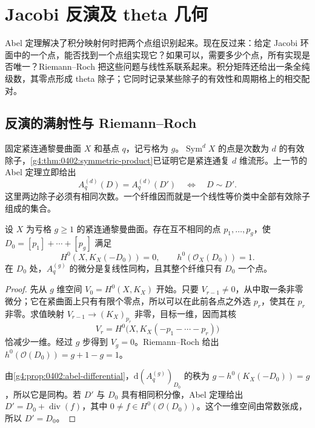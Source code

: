 
% 
% 

\section{Jacobi 反演及 theta 几何}
\label{g4:sec:0404}

Abel 定理解决了积分映射何时把两个点组识别起来。现在反过来：给定 Jacobi 环面中的一个点，能否找到一个点组实现它？如果可以，需要多少个点，所有实现是否唯一？Riemann--Roch 把这些问题与线性系联系起来。积分矩阵还给出一条全纯级数，其零点形成 theta 除子；它同时记录某些除子的有效性和周期格上的相交配对。

\subsection{反演的满射性与 Riemann–Roch}
\label{g4:subsec:0404:01}

固定紧连通黎曼曲面 \(X\) 和基点 \(q\)，记亏格为 \(g\)。\(\operatorname{Sym}^dX\) 的点是次数为 \(d\) 的有效除子，\cref{g4:thm:0402:symmetric-product}已证明它是紧连通复 \(d\) 维流形。上一节的 Abel 定理立即给出
\begin{equation}
	\label{g4:eq:0404:same-fiber}
	A_q^{(d)}(D)=A_q^{(d)}(D')
	\quad\Longleftrightarrow\quad D\sim D'.
\end{equation}
这里两边除子必须有相同次数。一个纤维因而就是一个线性等价类中全部有效除子组成的集合。

\begin{lemma}
	\label{g4:lem:0404:nonspecial-divisor}
	设 \(X\) 为亏格 \(g\ge1\) 的紧连通黎曼曲面。存在互不相同的点 \(p_1,\ldots,p_g\)，使 \(D_0=[p_1]+\cdots+[p_g]\) 满足
	\[
		H^0(X,K_X(-D_0))=0,\qquad h^0(\mathcal O_X(D_0))=1.
	\]
	在 \(D_0\) 处，\(A_q^{(g)}\) 的微分是复线性同构，且其整个纤维只有 \(D_0\) 一个点。
\end{lemma}
\begin{proof}
	先从 \(g\) 维空间 \(V_0=H^0(X,K_X)\) 开始。只要 \(V_{r-1}\ne0\)，从中取一条非零微分；它在紧曲面上只有有限个零点，所以可以在此前各点之外选 \(p_r\)，使其在 \(p_r\) 非零。求值映射 \(V_{r-1}\to(K_X)_{p_r}\) 非零，目标一维，因而其核
	\[
		V_r=H^0\bigl(X,K_X(-p_1-\cdots-p_r)\bigr)
	\]
	恰减少一维。经过 \(g\) 步得到 \(V_g=0\)。Riemann--Roch 给出 \(h^0(\mathcal O(D_0))=g+1-g=1\)。

	由\cref{g4:prop:0402:abel-differential}，\(\mathrm{d}(A_q^{(g)})_{D_0}\) 的秩为 \(g-h^0(K_X(-D_0))=g\)，所以它是同构。若 \(D'\) 与 \(D_0\) 具有相同积分像，Abel 定理给出 \(D'=D_0+\operatorname{div}(f)\)，其中 \(0\ne f\in H^0(\mathcal O(D_0))\)。这个一维空间由常数张成，所以 \(D'=D_0\)。
\end{proof}

